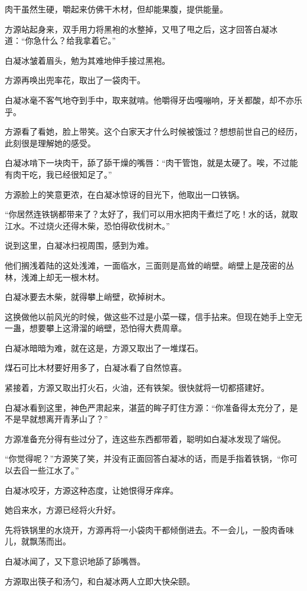\begin{this_body}
肉干虽然生硬，嚼起来仿佛干木材，但却能果腹，提供能量。

方源站起身来，双手用力将黑袍的水整掉，又甩了甩之后，这才回答白凝冰道：“你急什么？给我拿着它。”

白凝冰皱着眉头，勉为其难地伸手接过黑袍。

方源再唤出兜率花，取出了一袋肉干。

白凝冰毫不客气地夺到手中，取来就啃。他嚼得牙齿嘎嘣响，牙关都酸，却不亦乐乎。

方源看了看她，脸上带笑。这个白家天才什么时候被饿过？想想前世自己的经历，此刻很是理解她的感受。

白凝冰啃下一块肉干，舔了舔干燥的嘴唇：“肉干管饱，就是太硬了。唉，不过能有肉干吃，我已经很知足了。”

方源脸上的笑意更浓，在白凝冰惊讶的目光下，他取出一口铁锅。

“你居然连铁锅都带来了？太好了，我们可以用水把肉干煮烂了吃！水的话，就取江水。不过烧火还得木柴，恐怕得砍伐树木。”

说到这里，白凝冰扫视周围，感到为难。

他们搁浅着陆的这处浅滩，一面临水，三面则是高耸的峭壁。峭壁上是茂密的丛林，浅滩上却无一根木材。

白凝冰要去木柴，就得攀上峭壁，砍掉树木。

这换做他以前风光的时候，做这些不过是小菜一碟，信手拈来。但现在她手上空无一蛊，想要攀上这滑溜的峭壁，恐怕得大费周章。

白凝冰暗暗为难，就在这是，方源又取出了一堆煤石。

煤石可比木材要好用多了，白凝冰看了自然惊喜。

紧接着，方源又取出打火石，火油，还有铁架。很快就将一切都搭建好。

白凝冰看到这里，神色严肃起来，湛蓝的眸子盯住方源：“你准备得太充分了，是不是早就想离开青茅山了？”

方源准备充分得有些过分了，连这些东西都带着，聪明如白凝冰发现了端倪。

“你觉得呢？”方源笑了笑，并没有正面回答白凝冰的话，而是手指着铁锅，“你可以去舀一些江水了。”

白凝冰咬牙，方源这种态度，让她恨得牙痒痒。

她舀来水，方源已经将火升好。

先将铁锅里的水烧开，方源再将一小袋肉干都倾倒进去。不一会儿，一股肉香味儿，就飘荡而出。

白凝冰闻了，又下意识地舔了舔嘴唇。

方源取出筷子和汤勺，和白凝冰两人立即大快朵颐。


\end{this_body}
